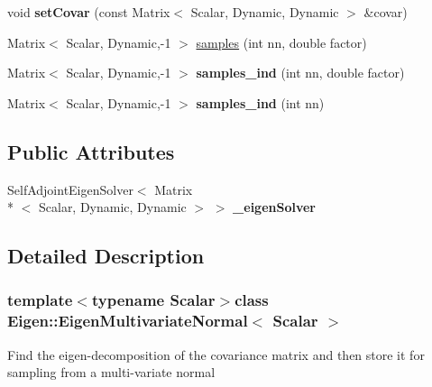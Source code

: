 \begin{DoxyCompactItemize}
\item 
\hypertarget{classEigen_1_1EigenMultivariateNormal_a56942d3a51cf934f85d5b95275da9d18}{void {\bfseries set\+Covar} (const Matrix$<$ Scalar, Dynamic, Dynamic $>$ \&covar)}\label{classEigen_1_1EigenMultivariateNormal_a56942d3a51cf934f85d5b95275da9d18}

\item 
Matrix$<$ Scalar, Dynamic,-\/1 $>$ \hyperlink{classEigen_1_1EigenMultivariateNormal_a0a0c8f8310e6469b3365e735e95c9c87}{samples} (int nn, double factor)
\item 
\hypertarget{classEigen_1_1EigenMultivariateNormal_a957ca8e363a84616c1cb235d595fbfcd}{Matrix$<$ Scalar, Dynamic,-\/1 $>$ {\bfseries samples\+\_\+ind} (int nn, double factor)}\label{classEigen_1_1EigenMultivariateNormal_a957ca8e363a84616c1cb235d595fbfcd}

\item 
\hypertarget{classEigen_1_1EigenMultivariateNormal_ac81198e693bee0a5b350cec5c8293897}{Matrix$<$ Scalar, Dynamic,-\/1 $>$ {\bfseries samples\+\_\+ind} (int nn)}\label{classEigen_1_1EigenMultivariateNormal_ac81198e693bee0a5b350cec5c8293897}

\end{DoxyCompactItemize}
\subsection*{Public Attributes}
\begin{DoxyCompactItemize}
\item 
\hypertarget{classEigen_1_1EigenMultivariateNormal_aceef5dd5ce5aee926fab9f051cd8904b}{Self\+Adjoint\+Eigen\+Solver$<$ Matrix\\*
$<$ Scalar, Dynamic, Dynamic $>$ $>$ {\bfseries \+\_\+eigen\+Solver}}\label{classEigen_1_1EigenMultivariateNormal_aceef5dd5ce5aee926fab9f051cd8904b}

\end{DoxyCompactItemize}


\subsection{Detailed Description}
\subsubsection*{template$<$typename Scalar$>$class Eigen\+::\+Eigen\+Multivariate\+Normal$<$ Scalar $>$}

Find the eigen-\/decomposition of the covariance matrix and then store it for sampling from a multi-\/variate normal 

